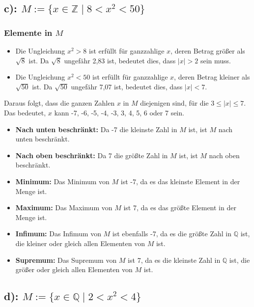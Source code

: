 \documentclass{article}
\theoremstyle{definition}
\theoremstyle{remark}
\begin{document}
\subsection*{c): \( M := \{x \in \mathbb{Z} \mid 8 < x^2 < 50\} \)}

\subsubsection*{Elemente in \( M \)}
\begin{itemize}
	\item Die Ungleichung \( x^2 > 8 \) ist erfüllt für ganzzahlige \( x \), deren Betrag größer als \( \sqrt{8} \) ist. Da \( \sqrt{8} \) ungefähr 2,83 ist, bedeutet dies, dass \( |x| > 2 \) sein muss.
	\item Die Ungleichung \( x^2 < 50 \) ist erfüllt für ganzzahlige \( x \), deren Betrag kleiner als \( \sqrt{50} \) ist. Da \( \sqrt{50} \) ungefähr 7,07 ist, bedeutet dies, dass \( |x| < 7 \).
\end{itemize}
Daraus folgt, dass die ganzen Zahlen \( x \) in \( M \) diejenigen sind, für die \( 3 \leq |x| \leq 7 \). Das bedeutet, \( x \) kann -7, -6, -5, -4, -3, 3, 4, 5, 6 oder 7 sein.
\begin{itemize}
	\item \textbf{Nach unten beschränkt:} Da -7 die kleinste Zahl in \( M \) ist, ist \( M \) nach unten beschränkt.
	\item \textbf{Nach oben beschränkt:} Da 7 die größte Zahl in \( M \) ist, ist \( M \) nach oben beschränkt.
	\item \textbf{Minimum:} Das Minimum von \( M \) ist -7, da es das kleinste Element in der Menge ist.
	\item \textbf{Maximum:} Das Maximum von \( M \) ist 7, da es das größte Element in der Menge ist.
	\item \textbf{Infimum:} Das Infimum von \( M \) ist ebenfalls -7, da es die größte Zahl in \( \mathbb{Q} \) ist, die kleiner oder gleich allen Elementen von \( M \) ist.
	\item \textbf{Supremum:} Das Supremum von \( M \) ist 7, da es die kleinste Zahl in \( \mathbb{Q} \) ist, die größer oder gleich allen Elementen von \( M \) ist.
\end{itemize}

\subsection*{d): \( M := \{x \in \mathbb{Q} \mid 2 < x^2 < 4\} \)}
\end{document}
